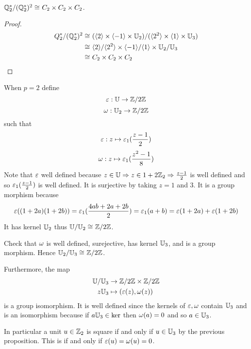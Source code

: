 \begin{cor}
    $\mathbb{Q}_2^* / (\mathbb{Q}_2^*)^2 \cong_{} C_2 \times C_2 \times C_2$.
\end{cor}
\begin{proof}
    \begin{align*}
        Q_2^* / (\mathbb{Q}_2^*)^2 &\cong_{} 
    (\langle2\rangle \times \langle-1\rangle \times \mathbb{U}_2)/
    (\langle2^2\rangle \times \langle1\rangle \times \mathbb{U}_3)\\
    &\cong_{} \langle2\rangle /\langle2^2\rangle \times \langle-1\rangle / \langle1\rangle 
    \times \mathbb{U}_2 / \mathbb{U}_3 \\
    &\cong_{}  C_2 \times C_2 \times C_2
    \end{align*}
\end{proof}

\begin{dfn}[Extensions of $\ep, \om$]
    When $p = 2$ define 
    \[\varepsilon : \mathbb{U} \to \mathbb{Z} / 2\mathbb{Z}\]
    \[\omega : \mathbb{U}_2 \to \mathbb{Z} / 2\mathbb{Z}\]
    such that 
    \[\varepsilon : z \mapsto \varepsilon_1(\frac{z - 1}{2})\]
    \[\omega : z \mapsto \varepsilon_1(\frac{z^2 - 1}{8})\]
    Note that $\varepsilon$ well defined because
    $z \in \mathbb{U} \Rightarrow z \in 1 + 2 \mathbb{Z}_2 
    \Rightarrow \frac{z - 1}{2}$ is well defined
    and so $\varepsilon_1(\frac{z - 1}{2})$ is well defined.
    It is surjective by taking $z = 1$ and $3$.
    It is a group morphism because 
    \[\varepsilon((1 + 2a)(1 + 2b)) = \varepsilon_1(\frac{4ab + 2a + 2b}{2}) = 
    \varepsilon_1({a+b}) = \varepsilon(1 + 2a)+\varepsilon(1 + 2b)\]
    It has kernel $\mathbb{U}_2$ thus $\mathbb{U} / \mathbb{U}_2 \cong_{} \mathbb{Z} / 2 \mathbb{Z}$.

    Check that $\omega$ is well defined, surejective, 
    has kernel $\mathbb{U}_3$, and is a group morphism.
    Hence $\mathbb{U}_2 / \mathbb{U}_3 \cong_{} \mathbb{Z} / 2 \mathbb{Z}$.

    Furthermore, the map
    \begin{align*}
        \mathbb{U} / \mathbb{U}_3 &\to \mathbb{Z} / 2\mathbb{Z} \times \mathbb{Z} / 2\mathbb{Z}\\
        z \mathbb{U}_3 &\mapsto (\varepsilon(z), \omega(z))
    \end{align*}
    is a group isomorphism.
    It is well defined since the kernels of 
    $\ep,\om$ contain $\mathbb{U}_3$ and is an isomorphism
    because if $a \mathbb{U}_3 \in \ker$ then $\omega(a) = 0$ and so
    $a \in \mathbb{U}_3$.

    In particular a unit $u \in \mathbb{Z}_2$ is square if and only if
    $u \in \mathbb{U}_3$ by the previous proposition. 
    This is if and only if $\varepsilon(u) = \omega(u) = 0$.
\end{dfn}

